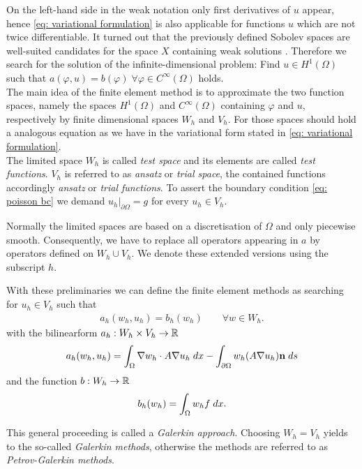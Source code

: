 On the left-hand side in the weak notation only first derivatives of $u$ appear, hence \eqref{eq: variational formulation} is also applicable for functions $u$ which are not twice differentiable. It turned out that the previously defined Sobolev spaces are well-suited candidates for the space $X$ containing weak solutions \cite[Chapter 1]{BS2002}. Therefore we search for the solution of the infinite-dimensional problem: Find $u\in H^1(\Omega)$ such that  $a(\varphi,u)  = b(\varphi) \;\forall \varphi \in C^\infty(\Omega)$ holds. \\%
The main idea of the finite element method is to approximate the two function spaces, namely the spaces $H^1(\Omega)$ and $C^\infty(\Omega)$ containing $\varphi$ and $u$, respectively by finite dimensional spaces $W_h$ and $V_h$. For those spaces should hold a analogous equation as we have in the variational form stated in \eqref{eq: variational formulation}.\\
The limited space $W_h$ is called \emph{test space} and its elements are called \emph{test functions}. $V_h$ is referred to as \emph{ansatz} or \emph{trial space}, the contained functions accordingly \emph{ansatz} or \emph{trial functions}. To assert the boundary condition \eqref{eq: poisson bc} we demand $u_h|_{\partial \Omega} = g$ for every $u_h \in V_h$.

Normally the limited spaces are based on a discretisation of $\Omega$ and only piecewise smooth. Consequently, we have to replace all operators appearing in $a$ by operators defined on $W_h \cup V_h$. We denote these extended versions using the subscript $h$.

With these preliminaries we can define the finite element methods as searching for $u_h \in V_h$ such that 
\begin{align}
a_h(w_h,u_h) = b_h(w_h) \qquad \forall w \in W_h. \label{eq: FE variational formulation}
\end{align}
with the bilinearform  $a_h:W_h \times V_h \rightarrow \mathbb{R}$
\begin{align*}
a_h(w_h,u_h)  = \int_{\Omega} {{ \nabla w_h  \cdot A\nabla u_h}\;dx} -\int_{\partial \Omega} {{ w_h (A\nabla u_h) \mathbf{n}}\;ds}
\end{align*}
and the function $b:W_h \rightarrow \mathbb{R}$
\begin{align*}
b_h(w_h) = \int_{\Omega} {{ w_h f}\;dx}.
\end{align*}

This general proceeding is called a \emph{Galerkin approach}. Choosing $W_h = V_h$ yields to the so-called \emph{Galerkin methods}, otherwise the methods are referred to as \emph{Petrov-Galerkin methods}.

